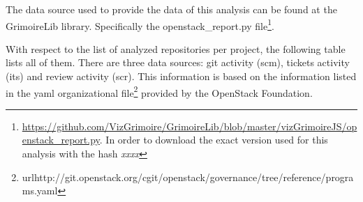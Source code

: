 \documentclass[a4wide,11pt]{report}
\begin{document}
The data source used to provide the data of this analysis can be found at the GrimoireLib library. Specifically the openstack\_report.py file\footnote{\url{https://github.com/VizGrimoire/GrimoireLib/blob/master/vizGrimoireJS/openstack_report.py}. In order to download the exact version used for this analysis with the hash \emph{xxxx}}. 


With respect to the list of analyzed repositories per project, the following table lists all of them.
There are three data sources: git activity (scm), tickets activity (its) and review activity (scr). This information is based on the information listed in the yaml organizational file\footnote{url{http://git.openstack.org/cgit/openstack/governance/tree/reference/programs.yaml}} provided by the OpenStack Foundation.



\end{document}
